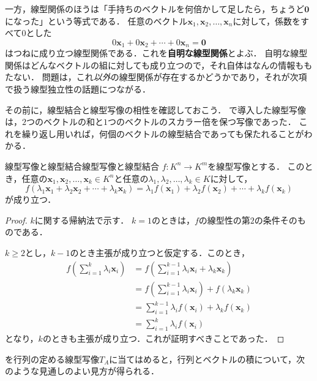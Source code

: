 一方，線型関係のほうは「手持ちのベクトルを何倍かして足したら，ちょうど$\bm{0}$になった」という等式である．
任意のベクトル$\bm{x}_1, \bm{x}_2, \dots, \bm{x}_n$に対して，係数をすべて$0$とした
\[
  0\bm{x}_1 + 0\bm{x}_2 + \cdots + 0\bm{x}_n = \bm{0}
\]
はつねに成り立つ線型関係である．これを\textbf{自明な線型関係}とよぶ．
自明な線型関係はどんなベクトルの組に対しても成り立つので，それ自体はなんの情報ももたない．
問題は，これ\emph{以外}の線型関係が存在するかどうかであり，それが次項で扱う線型独立性の話題につながる．

その前に，線型結合と線型写像の相性を確認しておこう．
で導入した線型写像は，$2$つのベクトルの和と$1$つのベクトルのスカラー倍を保つ写像であった．
これを繰り返し用いれば，何個のベクトルの線型結合であっても保たれることがわかる．

\begin{prop}{線型写像と線型結合}{線型写像と線型結合}
  $f \colon K^n \to K^m$を線型写像とする．
  このとき，任意の$\bm{x}_1, \bm{x}_2, \dots, \bm{x}_k \in K^n$と任意の$\lambda_1, \lambda_2, \dots, \lambda_k \in K$に対して，
  \[
    f(\lambda_1 \bm{x}_1 + \lambda_2 \bm{x}_2 + \cdots + \lambda_k \bm{x}_k)
    = \lambda_1 f(\bm{x}_1) + \lambda_2 f(\bm{x}_2) + \cdots + \lambda_k f(\bm{x}_k)
  \]
  が成り立つ．
\end{prop}

\begin{tleftbar}
\begin{proof}
  $k$に関する帰納法で示す．
  $k = 1$のときは，$f$の線型性の第$2$の条件そのものである．

  $k \ge 2$とし，$k - 1$のとき主張が成り立つと仮定する．このとき，
  \begin{align}
    f\left(\sum_{i=1}^{k} \lambda_i \bm{x}_i\right)
    &= f\left(\sum_{i=1}^{k-1} \lambda_i \bm{x}_i + \lambda_k \bm{x}_k\right) \nonumber \\
    &= f\left(\sum_{i=1}^{k-1} \lambda_i \bm{x}_i\right) + f(\lambda_k \bm{x}_k) \tag{$f$の線型性} \\
    &= \sum_{i=1}^{k-1} \lambda_i f(\bm{x}_i) + \lambda_k f(\bm{x}_k) \tag{帰納法の仮定と$f$の線型性} \\
    &= \sum_{i=1}^{k} \lambda_i f(\bm{x}_i) \nonumber
  \end{align}
  となり，$k$のときも主張が成り立つ．これが証明すべきことであった．
\end{proof}
\end{tleftbar}

を行列の定める線型写像$T_A$に当てはめると，行列とベクトルの積について，次のような見通しのよい見方が得られる．

